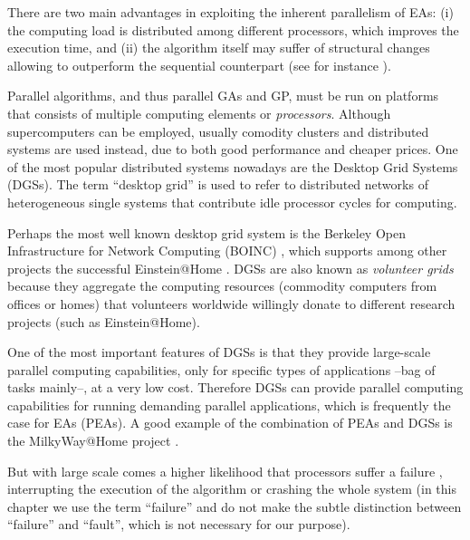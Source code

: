 \documentclass[graybox]{sty/svmult}
\begin{document}
There are two main advantages in
 exploiting the inherent parallelism of EAs: (i) the computing load is distributed among different processors, which improves the
execution time, and (ii) the algorithm itself may suffer of structural changes allowing to outperform the sequential counterpart
(see for instance \cite{spatially-structured-EAs}).

Parallel algorithms, and thus parallel GAs and GP, must be run on platforms that consists of multiple computing elements or \emph{processors}. Although supercomputers can be employed, usually comodity clusters and distributed systems are used instead, due to both good performance and cheaper prices.  One of the most popular distributed systems nowadays are the  Desktop Grid Systems (DGSs). 
The term ``desktop grid'' is used to refer to distributed networks of
heterogeneous single systems that contribute idle processor cycles for computing. 

Perhaps the most well known desktop grid system is the Berkeley Open Infrastructure for Network Computing (BOINC) \cite{boinc-paper}, 
which supports among other projects the successful Einstein@Home \cite{einsteinathome-2} . DGSs are also known as \emph{volunteer grids} because they
aggregate the computing resources (commodity computers from offices or homes) that volunteers worldwide willingly donate to different research 
projects (such as Einstein@Home). 

One of the most important features of DGSs is that they provide large-scale parallel computing capabilities, only for specific
types of applications --bag of tasks mainly--, at a very low cost. Therefore DGSs can provide parallel computing capabilities for running demanding parallel applications, which is frequently the case for EAs (PEAs).  A good example of the combination of PEAs and DGSs is the MilkyWay@Home project \cite{milkywayathome}. 


But with large scale comes a higher 
likelihood that processors suffer a failure \cite{largescale_failures}, interrupting the execution of the algorithm or crashing the whole system (in this 
chapter we use the term ``failure'' and do not make the subtle distinction between ``failure'' and ``fault'', which
is not necessary for our purpose).
\end{document}
